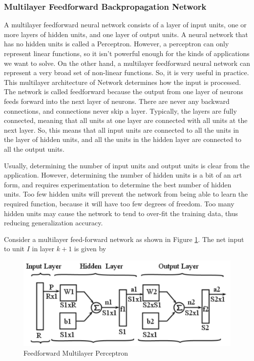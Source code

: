 \documentclass[12pt,a4paper,oneside]{article}
\numberwithin{equation}{section}
\numberwithin{algorithm}{section}
\begin{document}
	\subsubsection{Multilayer Feedforward Backpropagation Network}
	\label{multilayer_feedforward_network}
	
	A multilayer feedforward neural network consists of a layer of input units, one or more layers of hidden units, and one layer of output units. A neural network that has no hidden units is called a Perceptron. However, a perceptron can only represent linear functions, so it isn't powerful enough for the kinds of applications we want to solve. On the other hand, a multilayer feedforward neural network can represent a very broad set of non-linear functions. So, it is very useful in practice. This multilayer architecture of Network determines how the input is processed. The network is called feedforward because the output from one layer of neurons feeds forward into the next layer of neurons. There are never any backward connections, and connections never skip a layer. Typically, the layers are fully connected, meaning that all units at one layer are connected with all units at the next layer. So, this means that all input units are connected to all the units in the layer of hidden units, and all the units in the hidden layer are connected to all the output units.
	
	Usually, determining the number of input units and output units is clear from the application. However, determining the number of hidden units is a bit of an art form, and requires experimentation to determine the best number of hidden units. Too few hidden units will prevent the network from being able to learn the required function, because it will have too few degrees of freedom. Too many hidden units may cause the network to tend to over-fit the training data, thus reducing generalization accuracy.
	
	Consider a multilayer feed-forward network as shown in Figure \ref{figure_mlp}. The net input to unit $I$ in layer $k+1$ is given by
	
	\begin{figure}[hbtp]
	\centering
	\includegraphics[width=350pt]{figures/MLP}
	\caption{Feedforward Multilayer Perceptron}
	\label{figure_mlp}
	\end{figure}
	
\end{document}
